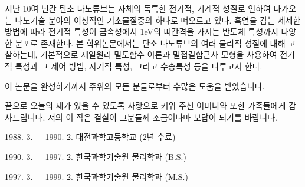 \documentclass[doctor,english,final]{kaist-ucs}
\begin{document}



\begin{summary}

    지난 10여 년간 탄소 나노튜브는 자체의 독특한 전기적, 기계적 성질로
    인하여 다가오는 나노기술 분야의 이상적인 기초물질중의 하나로 떠오르고
    있다. 흑연을 감는 세세한 방법에 따라 전기적 특성이 금속성에서 1eV의
    띠간격을 가지는 반도체 특성까지 다양한 분포로 존재한다.
    본 학위논문에서는 탄소 나노튜브의 여러 물리적 성질에 대해 고찰하는데,
    기본적으로 제일원리 밀도함수 이론과 밀접결합근사 모형을 사용하여 전기적
    특성과 그 제어 방법, 자기적 특성, 그리고 수송특성 등을 다루고자 한다.

\end{summary}


\acknowledgement[korean]

    이 논문을 완성하기까지 주위의 모든 분들로부터 수많은 도움을 받았습니다.

    끝으로 오늘의 제가 있을 수 있도록 사랑으로 키워 주신
    어머니와 또한 가족들에게 감사드립니다.
    저의 이 작은 결실이 그분들께 조금이나마 보답이 되기를 바랍니다.

\curriculumvitae[korean]

    \begin{personaldata}
        \address    {대전 유성구 구성동 ...}
    \end{personaldata}

    \begin{education}
        \item[1988. 3.\ --\ 1990. 2.] 대전과학고등학교 (2년 수료)
        \item[1990. 3.\ --\ 1997. 2.] 한국과학기술원 물리학과 (B.S.)
        \item[1997. 3.\ --\ 1999. 2.] 한국과학기술원 물리학과 (M.S.)
    \end{education}
\end{document}
